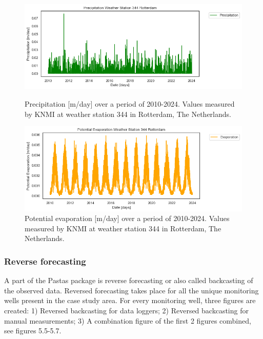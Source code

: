 \begin{figure}[htbp]
    \centering
    \begin{minipage}{0.45\textwidth}
        \centering
        \includegraphics[width=\linewidth]{figures/roz/p.png}
        \caption{Precipitation [m/day] over a period of 2010-2024. Values measured by KNMI at weather station 344 in Rotterdam, The Netherlands.}
        \label{fig:fig1}
    \end{minipage}\hfill
    \begin{minipage}{0.45\textwidth}
        \centering
        \includegraphics[width=\linewidth]{figures/roz/potevap.png}
        \caption{Potential evaporation [m/day] over a period of 2010-2024. Values measured by KNMI at weather station 344 in Rotterdam, The Netherlands.}
        \label{fig:fig2}
    \end{minipage}
\end{figure}

\subsubsection{Reverse forecasting}
A part of the Pastas package is reverse forecasting or also called backcasting of the observed data. Reversed forecasting takes place for all the unique monitoring wells present in the case study area. For every monitoring well, three figures are created: 1) Reversed backcasting for data loggers; 2) Reversed backcasting for manual measurements; 3) A combination figure of the first 2 figures combined, see figures 5.5-5.7.

